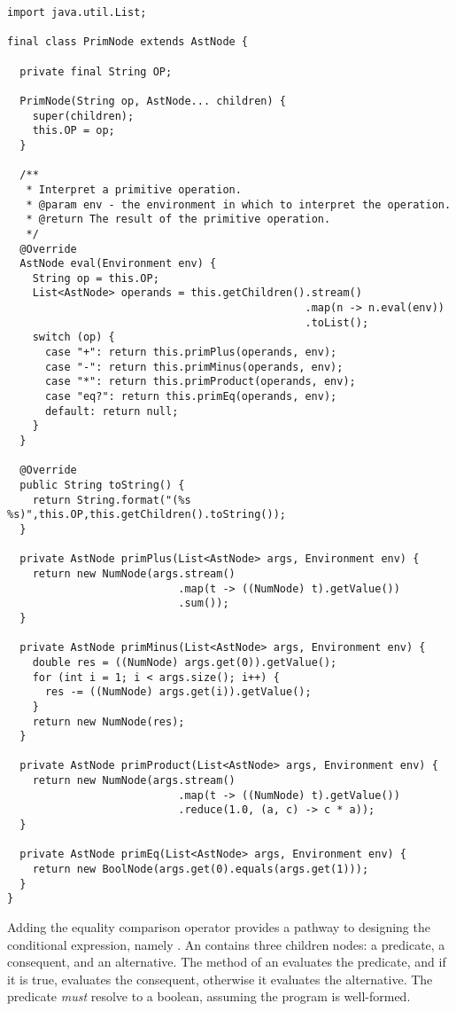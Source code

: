 \begin{lstlisting}[language=MyJava]
import java.util.List;

final class PrimNode extends AstNode {

  private final String OP;

  PrimNode(String op, AstNode... children) {
    super(children);
    this.OP = op;
  }

  /**
   * Interpret a primitive operation.
   * @param env - the environment in which to interpret the operation.
   * @return The result of the primitive operation.
   */
  @Override
  AstNode eval(Environment env) {
    String op = this.OP;
    List<AstNode> operands = this.getChildren().stream()
                                               .map(n -> n.eval(env))
                                               .toList();
    switch (op) {
      case "+": return this.primPlus(operands, env);
      case "-": return this.primMinus(operands, env);
      case "*": return this.primProduct(operands, env);
      case "eq?": return this.primEq(operands, env);
      default: return null;
    }
  }

  @Override
  public String toString() {
    return String.format("(%s %s)",this.OP,this.getChildren().toString());
  }

  private AstNode primPlus(List<AstNode> args, Environment env) {
    return new NumNode(args.stream()
                           .map(t -> ((NumNode) t).getValue())
                           .sum());
  }

  private AstNode primMinus(List<AstNode> args, Environment env) {
    double res = ((NumNode) args.get(0)).getValue();
    for (int i = 1; i < args.size(); i++) {
      res -= ((NumNode) args.get(i)).getValue();
    }
    return new NumNode(res);
  }

  private AstNode primProduct(List<AstNode> args, Environment env) {
    return new NumNode(args.stream()
                           .map(t -> ((NumNode) t).getValue())
                           .reduce(1.0, (a, c) -> c * a));
  }

  private AstNode primEq(List<AstNode> args, Environment env) {
    return new BoolNode(args.get(0).equals(args.get(1)));
  }
}
\end{lstlisting}

Adding the equality comparison operator provides a pathway to designing the conditional expression, namely . 
An  contains three children nodes: a predicate, a consequent, and an alternative. 
The  method of an  evaluates the predicate, and if it is true, evaluates the consequent, otherwise it evaluates the alternative. 
The predicate \emph{must} resolve to a boolean, assuming the program is well-formed. 

